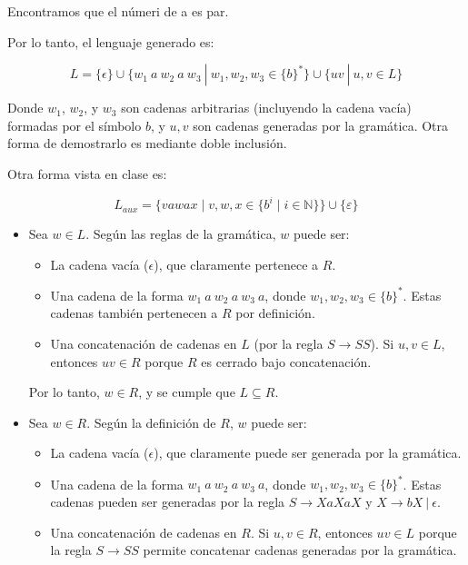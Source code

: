 \documentclass[12pt]{book} %
\begin{document}
\begin{enumerate}
\begin{solucion}[Ejercicio 1.d]
   Encontramos que el númeri de a es par.

   Por lo tanto, el lenguaje generado es:

   $$
   L = \{ \epsilon \} \cup \{ w_1 \ a \ w_2 \ a \ w_3  \ | \ w_1, w_2, w_3 \in \{b\}^* \} \cup \{ uv \ | \ u, v \in L \}
   $$

   Donde $w_1$, $w_2$, y $w_3$ son cadenas arbitrarias (incluyendo la cadena vacía) formadas por el símbolo $b$, y $u, v$ son cadenas generadas por la gramática. Otra forma de demostrarlo es mediante doble inclusión.

   Otra forma vista en clase es:

   $$
   L_{aux} = \{vawax \mid v,w,x \in \{b^i \mid i \in \mathbb{N} \} \} \cup \{\varepsilon\}
   $$


   \begin{itemize}
       \item {}

           Sea $w \in L$. Según las reglas de la gramática, $w$ puede ser:
           \begin{itemize}
               \item La cadena vacía ($\epsilon$), que claramente pertenece a $R$.
               \item Una cadena de la forma $w_1 \ a \ w_2 \ a \ w_3 \ a$, donde $w_1, w_2, w_3 \in \{b\}^*$. Estas cadenas también pertenecen a $R$ por definición.
               \item Una concatenación de cadenas en $L$ (por la regla $S \to SS$). Si $u, v \in L$, entonces $uv \in R$ porque $R$ es cerrado bajo concatenación.
           \end{itemize}

           Por lo tanto, $w \in R$, y se cumple que $L \subseteq R$.

       \item {}

           Sea $w \in R$. Según la definición de $R$, $w$ puede ser:
           \begin{itemize}
               \item La cadena vacía ($\epsilon$), que claramente puede ser generada por la gramática.
               \item Una cadena de la forma $w_1 \ a \ w_2 \ a \ w_3 \ a$, donde $w_1, w_2, w_3 \in \{b\}^*$. Estas cadenas pueden ser generadas por la regla $S \to XaXaX$ y $X \to bX \ | \ \epsilon$.
               \item Una concatenación de cadenas en $R$. Si $u, v \in R$, entonces $uv \in L$ porque la regla $S \to SS$ permite concatenar cadenas generadas por la gramática.
           \end{itemize}


\end{itemize}
\end{solucion}
\end{enumerate}
\end{document}
